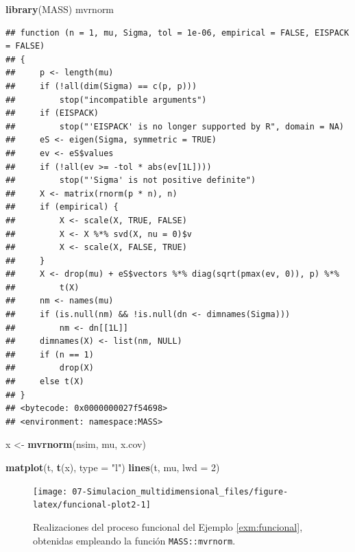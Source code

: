 \documentclass[
]{book}
\newenvironment{Shaded}{\begin{snugshade}}{\end{snugshade}}
\newcommand{\DataTypeTok}[1]{\textcolor[rgb]{0.13,0.29,0.53}{#1}}
\newcommand{\DecValTok}[1]{\textcolor[rgb]{0.00,0.00,0.81}{#1}}
\newcommand{\KeywordTok}[1]{\textcolor[rgb]{0.13,0.29,0.53}{\textbf{#1}}}
\newcommand{\NormalTok}[1]{#1}
\newcommand{\StringTok}[1]{\textcolor[rgb]{0.31,0.60,0.02}{#1}}
\theoremstyle{break}
\theoremstyle{definition}
\theoremstyle{definition}
\theoremstyle{definition}
\theoremstyle{remark}
\begin{document}
\begin{Shaded}
\begin{Highlighting}[]
\KeywordTok{library}\NormalTok{(MASS)}
\NormalTok{mvrnorm}
\end{Highlighting}
\end{Shaded}

\begin{verbatim}
## function (n = 1, mu, Sigma, tol = 1e-06, empirical = FALSE, EISPACK = FALSE) 
## {
##     p <- length(mu)
##     if (!all(dim(Sigma) == c(p, p))) 
##         stop("incompatible arguments")
##     if (EISPACK) 
##         stop("'EISPACK' is no longer supported by R", domain = NA)
##     eS <- eigen(Sigma, symmetric = TRUE)
##     ev <- eS$values
##     if (!all(ev >= -tol * abs(ev[1L]))) 
##         stop("'Sigma' is not positive definite")
##     X <- matrix(rnorm(p * n), n)
##     if (empirical) {
##         X <- scale(X, TRUE, FALSE)
##         X <- X %*% svd(X, nu = 0)$v
##         X <- scale(X, FALSE, TRUE)
##     }
##     X <- drop(mu) + eS$vectors %*% diag(sqrt(pmax(ev, 0)), p) %*% 
##         t(X)
##     nm <- names(mu)
##     if (is.null(nm) && !is.null(dn <- dimnames(Sigma))) 
##         nm <- dn[[1L]]
##     dimnames(X) <- list(nm, NULL)
##     if (n == 1) 
##         drop(X)
##     else t(X)
## }
## <bytecode: 0x0000000027f54698>
## <environment: namespace:MASS>
\end{verbatim}

\begin{Shaded}
\begin{Highlighting}[]
\NormalTok{x <-}\StringTok{ }\KeywordTok{mvrnorm}\NormalTok{(nsim, mu, x.cov)}

\KeywordTok{matplot}\NormalTok{(t, }\KeywordTok{t}\NormalTok{(x), }\DataTypeTok{type =} \StringTok{"l"}\NormalTok{)}
\KeywordTok{lines}\NormalTok{(t, mu, }\DataTypeTok{lwd =} \DecValTok{2}\NormalTok{)}
\end{Highlighting}
\end{Shaded}

\begin{figure}[!htb]

{\centering \texttt{[image: 07-Simulacion\_multidimensional\_files/figure-latex/funcional-plot2-1]} 

}

\caption{Realizaciones del proceso funcional del Ejemplo \ref{exm:funcional}, obtenidas empleando la función \texttt{MASS::mvrnorm}.}\label{fig:funcional-plot2}
\end{figure}
\end{document}
